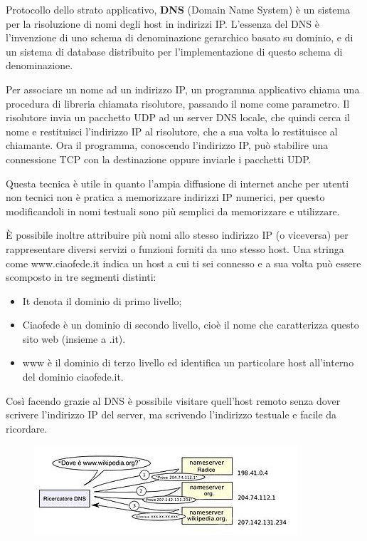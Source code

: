 Protocollo dello strato applicativo, \textbf{DNS} (Domain Name System) è un sistema per la risoluzione di nomi degli host in indirizzi IP. 
L’essenza del DNS è l’invenzione di uno schema di denominazione gerarchico basato su dominio, e di un sistema di database distribuito per l’implementazione di questo schema di denominazione.

Per associare un nome ad un indirizzo IP, un programma applicativo chiama una procedura di libreria chiamata risolutore, passando il nome come parametro. Il risolutore invia un pacchetto UDP ad un server DNS locale, che quindi cerca il nome e restituisci l’indirizzo IP al risolutore, che a sua volta lo restituisce al chiamante. Ora il programma, conoscendo l’indirizzo IP, può stabilire una connessione TCP con la destinazione oppure inviarle i pacchetti UDP.

Questa tecnica è utile in quanto l’ampia diffusione di internet anche per utenti non tecnici non è pratica a memorizzare indirizzi IP numerici, per questo modificandoli in nomi testuali sono più semplici da memorizzare e utilizzare.

È possibile inoltre attribuire più nomi allo stesso indirizzo IP (o viceversa) per rappresentare diversi servizi o funzioni forniti da uno stesso host.
Una stringa come www.ciaofede.it indica un host a cui ti sei connesso e a sua volta può essere scomposto in tre segmenti distinti:
\begin{itemize}
\item	It denota il dominio di primo livello;
\item	Ciaofede è un dominio di secondo livello, cioè il nome che caratterizza questo sito web (insieme a .it).
\item	www è il dominio di terzo livello ed identifica un particolare host all’interno del dominio ciaofede.it.
\end{itemize}
Così facendo grazie al DNS è possibile visitare quell’host remoto senza dover scrivere l’indirizzo IP del server, ma scrivendo l’indirizzo testuale e facile da ricordare.

\begin{figure}[H]
\centering
\includegraphics[scale=1]{res/img/50_DNS.png}
\end{figure}

